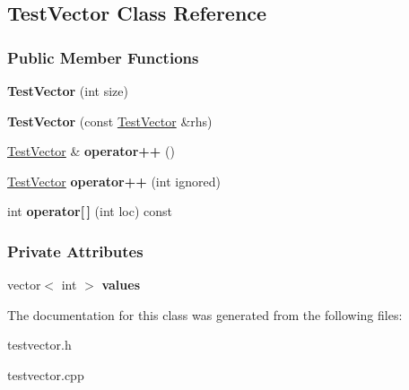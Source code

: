 \hypertarget{class_test_vector}{}\subsection{Test\+Vector Class Reference}
\label{class_test_vector}
\subsubsection*{Public Member Functions}
\begin{DoxyCompactItemize}
\item 
{\bfseries Test\+Vector} (int size)\hypertarget{class_test_vector_abf540180761043bb7ac2665e147bdd33}{}\label{class_test_vector_abf540180761043bb7ac2665e147bdd33}

\item 
{\bfseries Test\+Vector} (const \hyperlink{class_test_vector}{Test\+Vector} \&rhs)\hypertarget{class_test_vector_a4a48046f67cc822ce9a6907f022a5d61}{}\label{class_test_vector_a4a48046f67cc822ce9a6907f022a5d61}

\item 
\hyperlink{class_test_vector}{Test\+Vector} \& {\bfseries operator++} ()\hypertarget{class_test_vector_a8d4a95de7e0e9985ffcd86280efb631d}{}\label{class_test_vector_a8d4a95de7e0e9985ffcd86280efb631d}

\item 
\hyperlink{class_test_vector}{Test\+Vector} {\bfseries operator++} (int ignored)\hypertarget{class_test_vector_a1b9640623055cd4618606cd2f0ed08b3}{}\label{class_test_vector_a1b9640623055cd4618606cd2f0ed08b3}

\item 
int {\bfseries operator\mbox{[}$\,$\mbox{]}} (int loc) const \hypertarget{class_test_vector_ae244371b88cb0ab127a877e5206b7ed8}{}\label{class_test_vector_ae244371b88cb0ab127a877e5206b7ed8}

\end{DoxyCompactItemize}
\subsubsection*{Private Attributes}
\begin{DoxyCompactItemize}
\item 
vector$<$ int $>$ {\bfseries values}\hypertarget{class_test_vector_a5f1f8a4c55c4ce94b93b645c1813efc1}{}\label{class_test_vector_a5f1f8a4c55c4ce94b93b645c1813efc1}

\end{DoxyCompactItemize}


The documentation for this class was generated from the following files\+:\begin{DoxyCompactItemize}
\item 
testvector.\+h\item 
testvector.\+cpp\end{DoxyCompactItemize}

